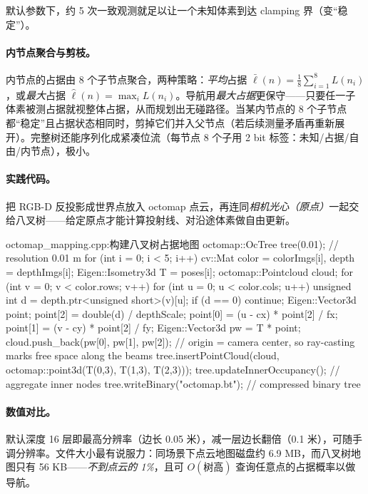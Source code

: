 \noindent{}默认参数下，约 5 次一致观测就足以让一个未知体素到达 clamping 界（变“稳定”）。

\paragraph{内节点聚合与剪枝。}
内节点的占据由 8 个子节点聚合，两种策略：\emph{平均}占据 $\bar\ell(n)=\frac18\sum_{i=1}^{8}L(n_i)$，或\emph{最大}占据 $\hat\ell(n)=\max_i L(n_i)$。导航用\emph{最大占据}更保守——只要任一子体素被测占据就视整体占据，从而规划出无碰路径。当某内节点的 8 个子节点都“稳定”且占据状态相同时，剪掉它们并入父节点（若后续测量矛盾再重新展开）。完整树还能序列化成紧凑位流（每节点 8 个子用 2 bit 标签：未知/占据/自由/内节点），极小。

\paragraph{实践代码。}
把 RGB-D 反投影成世界点放入 octomap 点云，再连同\emph{相机光心（原点）}一起交给八叉树——给定原点才能计算投射线、对沿途体素做自由更新。

\begin{codebox}[C++]{octomap\_mapping.cpp:构建八叉树占据地图}
octomap::OcTree tree(0.01);     // resolution 0.01 m
for (int i = 0; i < 5; i++) {
  cv::Mat color = colorImgs[i], depth = depthImgs[i];
  Eigen::Isometry3d T = poses[i];
  octomap::Pointcloud cloud;
  for (int v = 0; v < color.rows; v++)
  for (int u = 0; u < color.cols; u++) {
    unsigned int d = depth.ptr<unsigned short>(v)[u];
    if (d == 0) continue;
    Eigen::Vector3d point;
    point[2] = double(d) / depthScale;
    point[0] = (u - cx) * point[2] / fx;
    point[1] = (v - cy) * point[2] / fy;
    Eigen::Vector3d pw = T * point;
    cloud.push_back(pw[0], pw[1], pw[2]);
  }
  // origin = camera center, so ray-casting marks free space along the beams
  tree.insertPointCloud(cloud, octomap::point3d(T(0,3), T(1,3), T(2,3)));
}
tree.updateInnerOccupancy();    // aggregate inner nodes
tree.writeBinary("octomap.bt"); // compressed binary tree
\end{codebox}

\paragraph{数值对比。}
默认深度 16 层即最高分辨率（边长 0.05 米），减一层边长翻倍（0.1 米），可随手调分辨率。文件大小最有说服力：同场景下点云地图磁盘约 6.9 MB，而八叉树地图只有 56 KB——\emph{不到点云的 1\%}\cite{gaoxiang2019slam14}，且可 $O(\text{树高})$ 查询任意点的占据概率以做导航。

